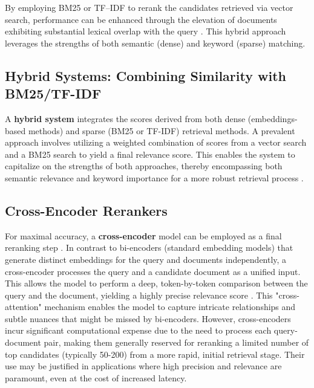 By employing BM25 or TF–IDF to rerank the candidates retrieved via vector search, performance can be enhanced through the elevation of documents exhibiting substantial lexical overlap with the query \autocite{gao2024retrievalaugmentedgenerationlargelanguage}. This hybrid approach leverages the strengths of both semantic (dense) and keyword (sparse) matching.

\subsection{Hybrid Systems: Combining Similarity with BM25/TF-IDF}
A \textbf{hybrid system} integrates the scores derived from both dense (embeddings-based methods) and sparse (BM25 or TF-IDF) retrieval methods. A prevalent approach involves utilizing a weighted combination of scores from a vector search and a BM25 search to yield a final relevance score. This enables the system to capitalize on the strengths of both approaches, thereby encompassing both semantic relevance and keyword importance for a more robust retrieval process \autocite{gao2024retrievalaugmentedgenerationlargelanguage}.

\subsection{Cross-Encoder Rerankers}
For maximal accuracy, a \textbf{cross-encoder} model can be employed as a final reranking step \autocite{nogueira2019passage}. In contrast to bi-encoders (standard embedding models) that generate distinct embeddings for the query and documents independently, a cross-encoder processes the query and a candidate document as a unified input. This allows the model to perform a deep, token-by-token comparison between the query and the document, yielding a highly precise relevance score \autocite{khattab2020colbertefficienteffectivepassage}. This "cross-attention" mechanism enables the model to capture intricate relationships and subtle nuances that might be missed by bi-encoders. However, cross-encoders incur significant computational expense due to the need to process each query-document pair, making them generally reserved for reranking a limited number of top candidates (typically 50-200) from a more rapid, initial retrieval stage. Their use may be justified in applications where high precision and relevance are paramount, even at the cost of increased latency.

